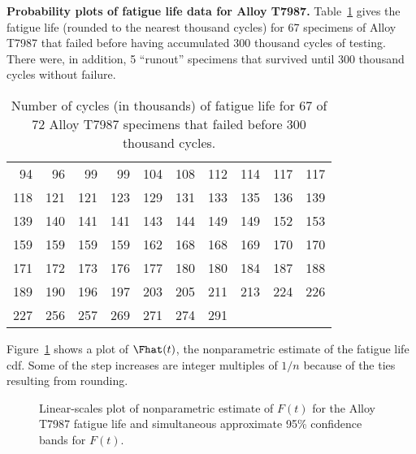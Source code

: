 \begin{example}
\label{example:alloy.t7987.data}
{\bf Probability plots of fatigue life data for Alloy T7987.} 
Table~\ref{table:alloy.t7987} gives the fatigue life (rounded to
the nearest thousand cycles) for 67 specimens
of Alloy T7987 that failed before having accumulated 300 thousand cycles of
testing. There were, in addition, 5 ``runout'' specimens that survived
until 300 thousand cycles without failure.
\begin{table}
\caption{Number of cycles (in thousands) of fatigue life for 67 of 72
Alloy T7987 specimens that failed before 300 thousand cycles.}
\centering\small
\begin{tabular}{*{10}{r}}
\\[-.5ex]
\hline
 94 &  96  &  99 &   99 &  104  &  108  & 112  & 114  & 117  & 117      \\
118  & 121  & 121  & 123  & 129   &  131  & 133  & 135  & 136  & 139     \\
139  & 140  & 141  &141  & 143  & 144 &  149 &  149  & 152  & 153     \\ 
159  & 159  & 159  & 159 & 162  & 168 &  168 &  169 &  170  & 170     \\ 
171  & 172  & 173  & 176  & 177  & 180  & 180 &  184 & 	187 &  188      \\
189  & 190 &  196 &  197  & 203  &  205 &  211  & 213  & 224  & 226      \\
227  & 256  & 257  & 269  & 271  & 274    & 291    \\
\hline      
\end{tabular}
\label{table:alloy.t7987}
\end{table}
Figure~\ref{figure:alloy.t7987.cdf.sim.ps}
shows a plot of $\Fhat(t)$, the nonparametric estimate of
the fatigue life cdf.
Some of the step increases are integer multiples of $1/n$ because of the
ties resulting from rounding.
\begin{figure}
\caption{Linear-scales plot of nonparametric estimate 
of $F(t)$ for the Alloy T7987
fatigue life and
simultaneous approximate 95\% confidence bands for $F(t)$.}
\label{figure:alloy.t7987.cdf.sim.ps}
\end{figure}

\end{example}
